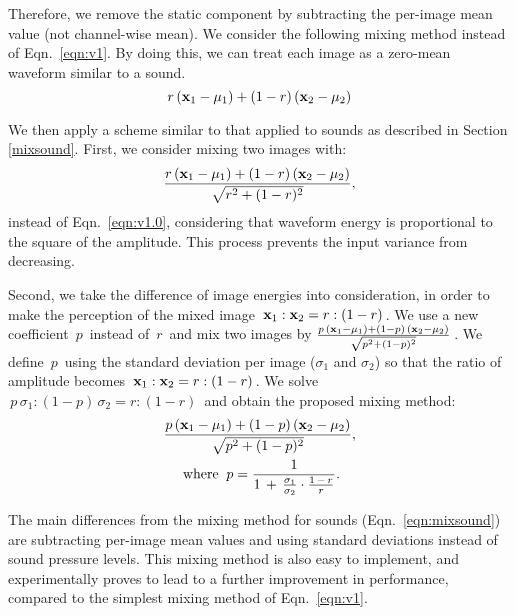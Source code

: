 \documentclass[10pt,twocolumn,letterpaper]{article}
\begin{document}
Therefore, we remove the static component by subtracting the per-image mean value (not channel-wise mean). We consider the following mixing method instead of Eqn.~\ref{eqn:v1}. By doing this, we can treat each image as a zero-mean waveform similar to a sound.
\begin{equation}
 \label{eqn:v1.0}
  r \, ({\bf x}_1 - \mu_1) + (1-r) \, ({\bf x}_2 - \mu_2)
\end{equation}

We then apply a scheme similar to that applied to sounds as described in Section \ref{mixsound}. First, we consider mixing two images with:
\begin{equation}
 \label{eqn:v1.5}
  \frac{r \, ({\bf x}_1-\mu_1) + (1-r) \, ({\bf x}_2-\mu_2)}{\sqrt{r^2 + (1-r)^2}},
\end{equation}
instead of Eqn.~\ref{eqn:v1.0}, considering that waveform energy is proportional to the square of the amplitude. This process prevents the input variance from decreasing.

Second, we take the difference of image energies into consideration, in order to make the perception of the mixed image $\, {\bf x}_1:{\bf x}_2=r:(1-r) \,$. We use a new coefficient $\,p \,$ instead of $\, r \,$ and mix two images by $\frac{p \, ({\bf x}_1 - \mu_1) + (1-p) \, ({\bf x}_2 - \mu_2)}{\sqrt{p^2 + (1-p)^2}}\,$. We define $\, p \,$ using the standard deviation per image ($\sigma_1$ and $\sigma_2$) so that the ratio of amplitude becomes $\, {\bf x}_1:{\bf x}_2=r:(1-r) \,$. We solve $\, p \, \sigma_1 : (1 - p)  \, \sigma_2 = r:(1-r) \,$ and obtain the proposed mixing method:
\begin{equation}
\begin{split}
 \label{eqn:v2}
  \frac{p \, ({\bf x}_1-\mu_1) + (1-p) \, ({\bf x}_2-\mu_2)}{\sqrt{p^2 + (1-p)^2}}, \\ 
  {\rm where} \;\; p = \frac{1}{1\,+\, \frac{\sigma_1}{\sigma_2} \cdot \frac{1\,-\,r}{r}}. \hspace{4mm}
\end{split}
\end{equation}

The main differences from the mixing method for sounds (Eqn.~\ref{eqn:mixsound}) are subtracting per-image mean values and using standard deviations instead of sound pressure levels. This mixing method is also easy to implement, and experimentally proves to lead to a further improvement in performance, compared to the simplest mixing method of Eqn.~\ref{eqn:v1}.
\end{document}
